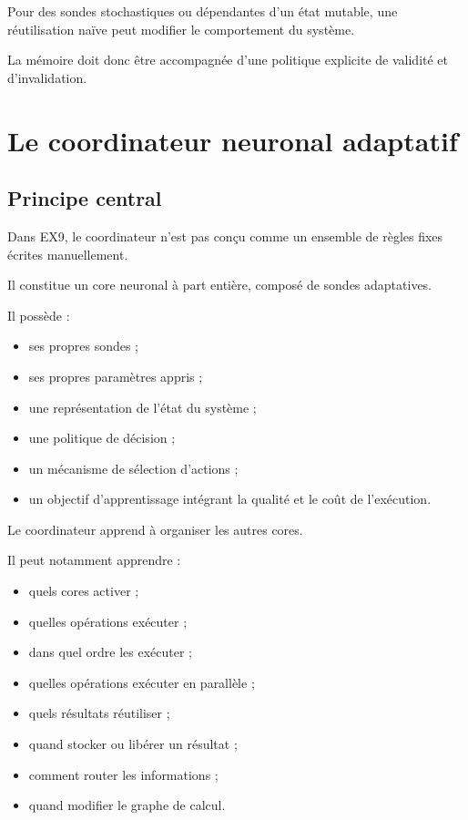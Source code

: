 \documentclass[11pt,a4paper]{article}
\begin{document}
Pour des sondes stochastiques ou dépendantes d'un état mutable,
une réutilisation naïve peut modifier le comportement du système.

La mémoire doit donc être accompagnée d'une politique explicite
de validité et d'invalidation.

\section{Le coordinateur neuronal adaptatif}

\subsection{Principe central}

Dans EX9, le coordinateur n'est pas conçu comme un ensemble de règles
fixes écrites manuellement.

Il constitue un core neuronal à part entière, composé de sondes
adaptatives.

Il possède :
\begin{itemize}
  \item ses propres sondes ;
  \item ses propres paramètres appris ;
  \item une représentation de l'état du système ;
  \item une politique de décision ;
  \item un mécanisme de sélection d'actions ;
  \item un objectif d'apprentissage intégrant la qualité et le coût
        de l'exécution.
\end{itemize}

Le coordinateur apprend à organiser les autres cores.

Il peut notamment apprendre :
\begin{itemize}
  \item quels cores activer ;
  \item quelles opérations exécuter ;
  \item dans quel ordre les exécuter ;
  \item quelles opérations exécuter en parallèle ;
  \item quels résultats réutiliser ;
  \item quand stocker ou libérer un résultat ;
  \item comment router les informations ;
  \item quand modifier le graphe de calcul.
\end{itemize}
\end{document}

